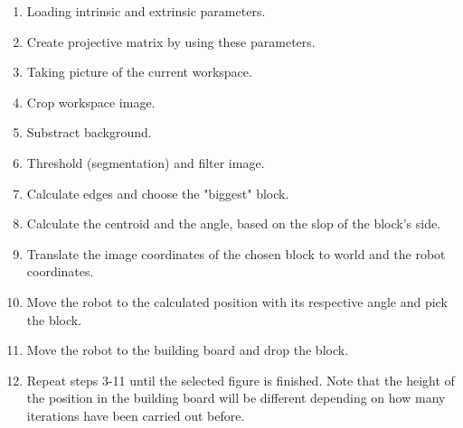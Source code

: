 \begin{enumerate}
	\item Loading intrinsic and extrinsic parameters.
	\item Create projective matrix by using these parameters.
	\item Taking picture of the current workspace.
	\item Crop workspace image. 
	\item Substract background.
	\item Threshold (segmentation) and filter image.
	\item Calculate edges and choose the "biggest" block.
	\item Calculate the centroid and the angle, based on the slop of the block's side.
	\item Translate the image coordinates of the chosen block to world and the robot coordinates.
	\item Move the robot to the calculated position with its respective angle and pick the block.
	\item Move the robot to the building board and drop the block.
	\item Repeat steps 3-11 until the selected figure is finished. Note that the height of the position in the building board will be different depending on how many iterations have been carried out before.
\end{enumerate}